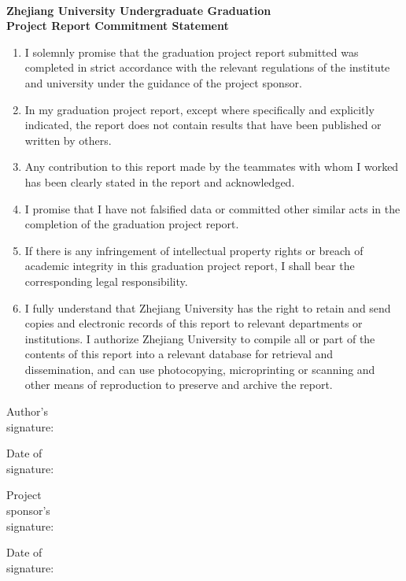 ~~~\\
\vspace{1em}
\begin{center}
    \LARGE\bfseries Zhejiang University Undergraduate Graduation\\
    Project Report Commitment Statement
\end{center}
\vspace{3em}
{\large
\begin{enumerate}
    \item I solemnly promise that the graduation project report submitted was completed in strict accordance with the relevant regulations of the institute and university under the guidance of the project sponsor.
    \item In my graduation project report, except where specifically and explicitly indicated, the report does not contain results that have been published or written by others.
    \item Any contribution to this report made by the teammates with whom I worked has been clearly stated in the report and acknowledged.
    \item I promise that I have not falsified data or committed other similar acts in the completion of the graduation project report.
    \item If there is any infringement of intellectual property rights or breach of academic integrity in this graduation project report, I shall bear the corresponding legal responsibility.
    \item I fully understand that Zhejiang University has the right to retain and send copies and electronic records of this report to relevant departments or institutions. I authorize Zhejiang University to compile all or part of the contents of this report into a relevant database for retrieval and dissemination, and can use photocopying, microprinting or scanning and other means of reproduction to preserve and archive the report.
\end{enumerate}
\vfill
\begin{center}
    \hfill
    \begin{minipage}{0.46\linewidth}
        Author's\\
        signature:\\
        \vspace{2em}
    
        Date of\\
        signature:
    \end{minipage}
    \hfill
    \begin{minipage}{0.4\linewidth}
        Project\\
        sponsor's\\
        signature:\\
        \vspace{1em}
    
        Date of\\
        signature:
    \end{minipage}
    \vspace{2em}
\end{center}
}